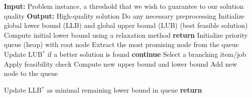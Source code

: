 \documentclass[moor,sglanonrev]{informs4}
\theoremstyle{plain}
\begin{document}
\begin{APPENDICES}
\begin{algorithm}
\caption{Branch and Bound Algorithm. The steps denoted with $*$ must be changed when switching from minimization to maximization. }
\label{alg:branch_and_bound}
\footnotesize
\begin{algorithmic}[1]
    \State \textbf{Input:} Problem instance, a threshold that we wish to guarantee to our solution quality
    \State \textbf{Output:} High-quality solution
    \State Do any necessary preprocessing
    \State Initialize global lower bound (LLB) and global upper bound (LUB) (best feasible solution)
    \State Compute initial lower bound using a relaxation method
        \textbf{return}
    \EndIf
    \State Initialize priority queue (heap) with root node
        \State Extract the most promising node from the queue
            \State Update LUB$^*$ if a better solution is found
            \State \textbf{continue}
        \EndIf
        \State Select a branching item/job
            \State Apply feasibility check
            \State Compute new upper bound and lower bound
                \State Add new node to the queue
            \EndIf
        \EndFor

        \State Update LLB$^*$ as minimal remaining lower bound in queue
            \State \textbf{return}
        \EndIf
    \EndWhile
\end{algorithmic}
\end{algorithm}



\end{APPENDICES}
\end{document}
